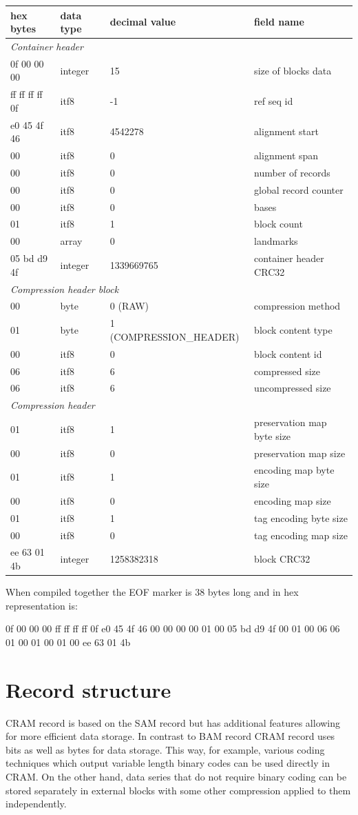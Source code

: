 \documentclass[a4paper]{article}
\begin{document}
\begin{tabular}{|l|l|>{\raggedright}p{150pt}|>{\raggedright}p{180pt}|}
\hline
\textbf{hex bytes} & \textbf{data type} & \textbf{decimal value} & \textbf{field 
name}\tabularnewline
\hline
\multicolumn{4}{|l|}{\textit{Container header}}\tabularnewline
\hline
0f 00 00 00 & integer & 15 & size of blocks data\tabularnewline
\hline
ff ff ff ff 0f & itf8 & -1 & ref seq id\tabularnewline
\hline
e0 45 4f 46 & itf8 & 4542278 & alignment start\tabularnewline
\hline
00 & itf8 & 0 & alignment span\tabularnewline
\hline
00 & itf8 & 0 & number of records\tabularnewline
\hline
00 & itf8 & 0 & global record counter\tabularnewline
\hline
00 & itf8 & 0 & bases\tabularnewline
\hline
01 & itf8 & 1 & block count\tabularnewline
\hline
00 & array & 0 & landmarks\tabularnewline
\hline
05 bd d9 4f & integer & 1339669765 & container header CRC32\tabularnewline
\hline
\multicolumn{4}{|l|}{\textit{Compression header block}}\tabularnewline
\hline
00 & byte & 0 (RAW) & compression method\tabularnewline
\hline
01 & byte & 1 (COMPRESSION\_HEADER) & block content type\tabularnewline
\hline
00 & itf8 & 0 & block content id\tabularnewline
\hline
06 & itf8 & 6 & compressed size\tabularnewline
\hline
06 & itf8 & 6 & uncompressed size\tabularnewline
\hline
\multicolumn{4}{|l|}{\textit{Compression header}}\tabularnewline
\hline
01 & itf8 & 1 & preservation map byte size\tabularnewline
\hline
00 & itf8 & 0 & preservation map size\tabularnewline
\hline
01 & itf8 & 1 & encoding map byte size\tabularnewline
\hline
00 & itf8 & 0 & encoding map size\tabularnewline
\hline
01 & itf8 & 1 & tag encoding byte size\tabularnewline
\hline
00 & itf8 & 0 & tag encoding map size\tabularnewline
\hline
ee 63 01 4b & integer & 1258382318 & block CRC32\tabularnewline
\hline
\end{tabular}

When compiled together the EOF marker is 38 bytes long and in hex representation 
is:

0f 00 00 00 ff ff ff ff 0f e0 45 4f 46 00 00 00 00 01 00 05 bd d9 4f 00 01 00 06 06 01 00 01 00 01 00 ee 63 01 4b

\section{\textbf{Record structure}}
\label{sec:record}

CRAM record is based on the SAM record but has additional features allowing for 
more efficient data storage.  In contrast to BAM record CRAM record uses bits as 
well as bytes for data storage. This way, for example, various coding techniques 
which output variable length binary codes can be used directly in CRAM. On the 
other hand, data series that do not require binary coding can be stored separately 
in external blocks with some other compression applied to them independently.
\end{document}
